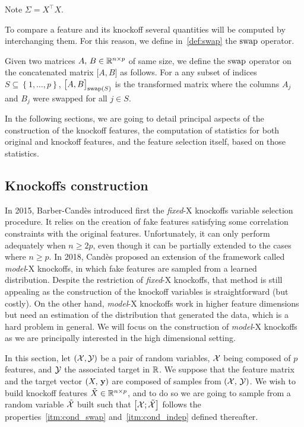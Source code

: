 Note $\Sigma = X^\top X$.

To compare a feature and its knockoff several quantities will be computed by interchanging them.
For this reason, we define in~\ref{def:swap} the $\operatorname{swap}$ operator.
\begin{definition}\label{def:swap}
    Given two matrices $A,\,B \in \mathbb{R}^{n \times p}$ of same size,
    we define the $\operatorname{swap}$ operator on the concatenated matrix $\big[ A, B \big]$ as follows.
    For a any subset of indices $S \subseteq \left\{ 1, \dots, p \right\}$,
    $\big[ A, B \big]_{\operatorname{swap}(S)}$ is the transformed matrix where the columns $A_j$ and $B_j$ were swapped for all
    $j \in S$.
\end{definition}

In the following sections, we are going to detail principal aspects of the construction of the knockoff features,
the computation of statistics for both original and knockoff features,
and the feature selection itself, based on those statistics.

\subsection{Knockoffs construction}\label{subsec:kc}

In 2015, Barber-Candès introduced first the \textit{fixed}-X knockoffs variable selection procedure.
It relies on the creation of fake features satisfying some correlation constraints with the original features.
Unfortunately, it can only perform adequately when $n \geq 2p$,
even though it can be partially extended to the cases where $n \geq p$.
In 2018, Candès proposed an extension of the framework called \textit{model}-X knockoffs,
in which fake features are sampled from a learned distribution.
Despite the restriction of \textit{fixed}-X knockoffs, that method is still appealing as the construction of the
knockoff variables is straightforward (but costly).
On the other hand, \textit{model}-X knockoffs work in higher feature dimensions
but need an estimation of the distribution that generated the data,
which is a hard problem in general.
We will focus on the construction of \textit{model}-X knockoffs as we are principally interested in the
high dimensional setting.

In this section, let $(\mathcal{X}, \mathcal{Y})$ be a pair of random variables,
$\mathcal{X}$ being composed of $p$ features,
and $\mathcal{Y}$ the associated target in $\mathbb{R}$.
We suppose that the feature matrix and the target vector $(X,\, \mathbf{y})$ are composed of samples from $(\mathcal{X},\, \mathcal{Y})$.
We wish to build knockoff features $\tilde{X} \in \mathbb{R}^{n \times p}$, and to do so we are going to sample from a
random variable $\tilde{\mathcal{X}}$ built such that $\big[ \mathcal{X}; \tilde{\mathcal{X}} \big]$
follows the properties~\ref{itm:cond_swap} and~\ref{itm:cond_indep} defined thereafter.

